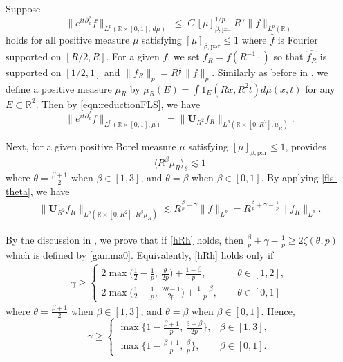 \documentclass[11pt]{amsart}
\theoremstyle{definition}
\theoremstyle{remark}
\newcommand{\R}{\mathbb{R}}
\newcommand{\les}{\lesssim}
\newcommand{\inn}[1]{\langle  #1 \rangle}
\begin{document}
Suppose
\begin{equation}\label{fls-theta}
  \big\| e^{it\partial_x^2}f \big\|_{L^p(\R\times[0,1],\,d\mu)}
  \;\le\; C\, [\mu]_{\beta,\text{par}}^{1/p}\, R^\gamma\|f\|_{L^p(\R)}
\end{equation}
holds for all positive measure $\mu$ satisfying $[\mu]_{\beta,\text{par}} \le1$
where $\widehat {f}$ is Fourier supported on $[R/2,R]$.
For a given $f$, we set $f_R =f(R^{-1}\cdot)$ so that $\widehat {f_R}$ is supported on $[1/2,1]$ and $\|f_R\|_p =R^{\frac1{p}}\|f\|_{p}$.
Similarly as before in , we define a positive measure $\mu_R$ by
$
\mu_R(E) = \int 1_E(Rx,R^2 t) d\mu(x,t)
$
for any $E\subset \R^2$.
Then by \eqref{eqn:reductionFLS}, we have
\[
\big\|e^{it\partial_x^2}f\big\|_{L^p(\R\times [0,1],\mu)}=
\big\|\mathbf U_{R^2}f_R\big\|_{L^p(\R\times [0,R^2],\mu_R)}.
\]


Next, for a given positive Borel measure $\mu$ satisfying $[\mu]_{\beta,\text{par}}\le1$,  provides
\[
\inn{R^\beta\mu_R}_{\theta} \les 1
\]
where $\theta=\frac{\beta+1}2$ when $\beta\in[1,3]$, and $\theta=\beta$ when $\beta\in[0,1]$.
By applying \eqref{fls-theta}, we have
\begin{align}\label{hRh}
\big\|\mathbf U_{R^2} f_R\big\|_{L^p(\R\times [0,R^2],R^\beta\mu_R)}
\lesssim R^{\frac{\beta}p+\gamma}\|f\|_{L^p}
=R^{\frac{\beta}p+\gamma-\frac{1}{p}}\|f_R\|_{L^p}. 
\end{align}





By the discussion in , we prove that if \eqref{hRh} holds,
then $\frac \beta p +\gamma -\frac 1p\ge2\zeta(\theta,p)$ which is defined by \eqref{gamma0}. Equivalently, \eqref{hRh} holds only if
\begin{align*}
\gamma \ge 
\begin{cases}
2\max\big(\frac12-\frac1p, ~\frac{\theta}{2p}\big) +\frac{1-\beta}p, \quad~ &\theta\in[1,2],\\[1ex]
2\max\big(\frac12-\frac1p, ~\frac{2\theta-1}{2p}\big) +\frac{1-\beta}p, \quad~&\theta \in [0,1]
\end{cases}
\end{align*}
where $\theta=\frac{\beta+1}2$ when $\beta\in[1,3]$, and $\theta=\beta$ when $\beta\in[0,1]$.
Hence,
\[
  \gamma\ge
  \begin{cases}
  \max\!\big\{1-\frac{\beta+1}{p},\, \frac{3-\beta}{2p}\big\}, & \beta\in[1,3],\\[1ex]
\max\!\big\{1-\frac{\beta+1}{p},\,\frac\beta p\}, & \beta\in[0,1].
  \end{cases}
\]
\end{document}
